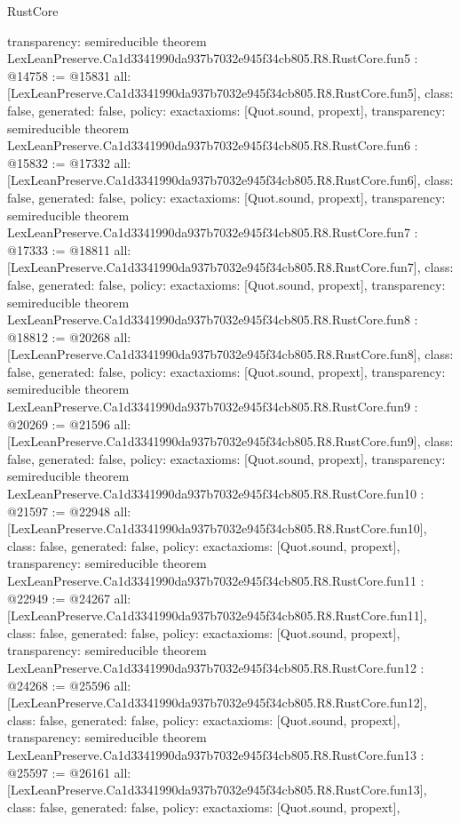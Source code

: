 \begin{lexlean}{RustCore}
\begin{coremodule}
{  transparency: semireducible
}
theorem LexLeanPreserve.Ca1d3341990da937b7032e945f34cb805.R8.RustCore.fun5 : @14758 := @15831 {
  all: [LexLeanPreserve.Ca1d3341990da937b7032e945f34cb805.R8.RustCore.fun5],
  class: false,
  generated: false,
  policy: exact{axioms: [Quot.sound, propext]},
  transparency: semireducible
}
theorem LexLeanPreserve.Ca1d3341990da937b7032e945f34cb805.R8.RustCore.fun6 : @15832 := @17332 {
  all: [LexLeanPreserve.Ca1d3341990da937b7032e945f34cb805.R8.RustCore.fun6],
  class: false,
  generated: false,
  policy: exact{axioms: [Quot.sound, propext]},
  transparency: semireducible
}
theorem LexLeanPreserve.Ca1d3341990da937b7032e945f34cb805.R8.RustCore.fun7 : @17333 := @18811 {
  all: [LexLeanPreserve.Ca1d3341990da937b7032e945f34cb805.R8.RustCore.fun7],
  class: false,
  generated: false,
  policy: exact{axioms: [Quot.sound, propext]},
  transparency: semireducible
}
theorem LexLeanPreserve.Ca1d3341990da937b7032e945f34cb805.R8.RustCore.fun8 : @18812 := @20268 {
  all: [LexLeanPreserve.Ca1d3341990da937b7032e945f34cb805.R8.RustCore.fun8],
  class: false,
  generated: false,
  policy: exact{axioms: [Quot.sound, propext]},
  transparency: semireducible
}
theorem LexLeanPreserve.Ca1d3341990da937b7032e945f34cb805.R8.RustCore.fun9 : @20269 := @21596 {
  all: [LexLeanPreserve.Ca1d3341990da937b7032e945f34cb805.R8.RustCore.fun9],
  class: false,
  generated: false,
  policy: exact{axioms: [Quot.sound, propext]},
  transparency: semireducible
}
theorem LexLeanPreserve.Ca1d3341990da937b7032e945f34cb805.R8.RustCore.fun10 : @21597 := @22948 {
  all: [LexLeanPreserve.Ca1d3341990da937b7032e945f34cb805.R8.RustCore.fun10],
  class: false,
  generated: false,
  policy: exact{axioms: [Quot.sound, propext]},
  transparency: semireducible
}
theorem LexLeanPreserve.Ca1d3341990da937b7032e945f34cb805.R8.RustCore.fun11 : @22949 := @24267 {
  all: [LexLeanPreserve.Ca1d3341990da937b7032e945f34cb805.R8.RustCore.fun11],
  class: false,
  generated: false,
  policy: exact{axioms: [Quot.sound, propext]},
  transparency: semireducible
}
theorem LexLeanPreserve.Ca1d3341990da937b7032e945f34cb805.R8.RustCore.fun12 : @24268 := @25596 {
  all: [LexLeanPreserve.Ca1d3341990da937b7032e945f34cb805.R8.RustCore.fun12],
  class: false,
  generated: false,
  policy: exact{axioms: [Quot.sound, propext]},
  transparency: semireducible
}
theorem LexLeanPreserve.Ca1d3341990da937b7032e945f34cb805.R8.RustCore.fun13 : @25597 := @26161 {
  all: [LexLeanPreserve.Ca1d3341990da937b7032e945f34cb805.R8.RustCore.fun13],
  class: false,
  generated: false,
  policy: exact{axioms: [Quot.sound, propext]},
}
\end{coremodule}
\end{lexlean}
